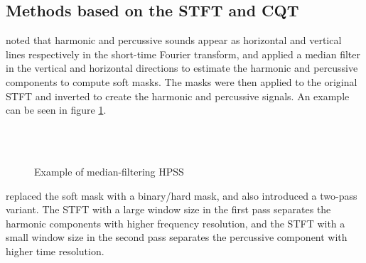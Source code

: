 \documentclass[10pt,letter]{article}
\begin{document}
\subsection{Methods based on the STFT and CQT}

\citet{fitzgerald1} noted that harmonic and percussive sounds appear as horizontal and vertical lines respectively in the short-time Fourier transform, and applied a median filter in the vertical and horizontal directions to estimate the harmonic and percussive components to compute soft masks. The masks were then applied to the original STFT and inverted to create the harmonic and percussive signals. An example can be seen in figure \ref{fig:fitz1}.

\begin{figure}[ht]
	\centering
	\\
	\\
	\caption{Example of median-filtering HPSS}
	\label{fig:fitz1}
\end{figure}

\citet{driedger} replaced the soft mask with a binary/hard mask, and also introduced a two-pass variant. The STFT with a large window size in the first pass separates the harmonic components with higher frequency resolution, and the STFT with a small window size in the second pass separates the percussive component with higher time resolution.
\end{document}
